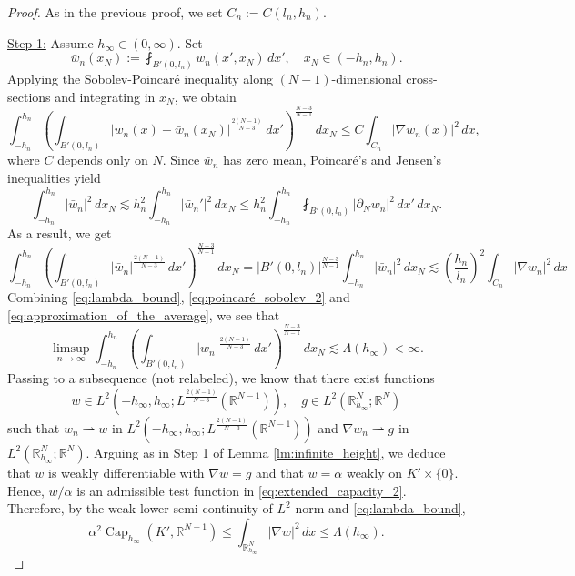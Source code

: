 \documentclass{article}
\numberwithin{equation}{section}
\theoremstyle{definition}
\theoremstyle{remark}
\newcommand{\cpct}{\operatorname{Cap}}
\begin{document}
\begin{proof}
    As in the previous proof, we set $C_n := C(l_n, h_n)$.
    
    \underline{Step 1:} Assume $h_\infty \in (0, \infty)$. Set
    \[
    \bar{w}_n(x_N) := \fint_{B'(0, l_n)} w_n(x', x_N) \, dx', \quad x_N \in (-h_n, h_n).
    \]
    Applying the Sobolev-Poincaré inequality along $(N - 1)$-dimensional cross-sections and integrating in $x_N$, we obtain
    \begin{equation} \label{eq:poincaré_sobolev_2}
        \int_{-h_n}^{h_n} \left(\int_{B'(0, l_n)} |w_n(x) - \bar{w}_n(x_N)|^\frac{2(N - 1)}{N - 3} \, dx'\right)^\frac{N - 3}{N - 1} \, dx_N \le C \int_{C_n} |\nabla w_n(x)|^2 \, dx,
    \end{equation}
    where $C$ depends only on $N$. Since $\bar{w}_n$ has zero mean, Poincaré's and Jensen's inequalities yield
    \[
    \int_{-h_n}^{h_n} |\bar{w}_n|^2 \, dx_N \lesssim h_n^2 \int_{-h_n}^{h_n} |\bar{w}_n'|^2 \, dx_N \le h_n^2 \int_{-h_n}^{h_n} \fint_{B'(0, l_n)} |\partial_N w_n|^2 \, dx' \, dx_N.
    \]
    As a result, we get
    \begin{equation} \label{eq:approximation_of_the_average}
        \int_{-h_n}^{h_n} \left(\int_{B'(0, l_n)} |\bar{w}_n|^\frac{2(N - 1)}{N - 3} \, dx'\right)^\frac{N - 3}{N - 1} \, dx_N = |B'(0, l_n)|^\frac{N - 3}{N - 1} \int_{-h_n}^{h_n} |\bar{w}_n|^2 \, dx_N \lesssim \left(\frac{h_n}{l_n}\right)^2 \int_{C_n} |\nabla w_n|^2 \, dx
    \end{equation}
    Combining \eqref{eq:lambda_bound}, \eqref{eq:poincaré_sobolev_2} and \eqref{eq:approximation_of_the_average}, we see that
    \[
    \limsup_{n \to \infty} \int_{-h_n}^{h_n} \left(\int_{B'(0, l_n)} |w_n|^\frac{2(N - 1)}{N - 3} \, dx'\right)^\frac{N - 3}{N - 1} \, dx_N \lesssim \Lambda(h_\infty) < \infty.
    \]
    Passing to a subsequence (not relabeled), we know that there exist functions 
    \[
    w \in L^2(-h_\infty, h_\infty; L^\frac{2(N - 1)}{N - 3}(\mathbb{R}^{N - 1})), \quad g \in L^2(\mathbb{R}_{h_\infty}^N; \mathbb{R}^N)
    \]
    such that $w_n \rightharpoonup w$ in $L^2(-h_\infty, h_\infty; L^\frac{2(N - 1)}{N - 3}(\mathbb{R}^{N - 1}))$ and $\nabla w_n \rightharpoonup g$ in $L^2(\mathbb{R}_{h_\infty}^N; \mathbb{R}^N)$. Arguing as in Step 1 of Lemma \ref{lm:infinite_height}, we deduce that $w$ is weakly differentiable with $\nabla w = g$ and that $w = \alpha$ weakly on $K' \times \{0\}$. Hence, $w/\alpha$ is an admissible test function in \eqref{eq:extended_capacity_2}. Therefore, by the weak lower semi-continuity of $L^2$-norm and \eqref{eq:lambda_bound},
    \[
    \alpha^2 \cpct_{h_\infty}(K', \mathbb{R}^{N - 1}) \le \int_{\mathbb{R}_{h_\infty}^N} |\nabla w|^2 \, dx \le \Lambda(h_\infty).
    \]


\end{proof}
\end{document}
